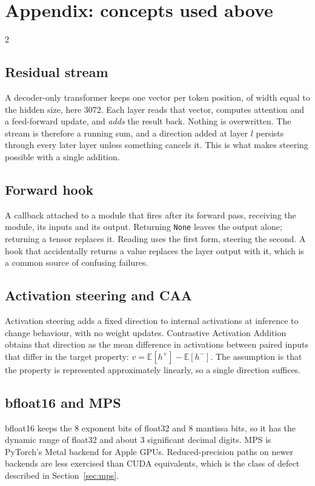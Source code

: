 \documentclass[twocolumn,10pt,a4paper]{article}
\newcommand{\code}[1]{\texttt{\small #1}}
\begin{document}
\section*{Appendix: concepts used above}
\begin{multicols}{2}
\small

\subsection*{Residual stream}
A decoder-only transformer keeps one vector per token position, of width equal to
the hidden size, here 3072. Each layer reads that vector, computes attention and
a feed-forward update, and \emph{adds} the result back. Nothing is overwritten.
The stream is therefore a running sum, and a direction added at layer $l$
persists through every later layer unless something cancels it. This is what
makes steering possible with a single addition.

\subsection*{Forward hook}
A callback attached to a module that fires after its forward pass, receiving the
module, its inputs and its output. Returning \code{None} leaves the output alone;
returning a tensor replaces it. Reading uses the first form, steering the second.
A hook that accidentally returns a value replaces the layer output with it, which
is a common source of confusing failures.

\subsection*{Activation steering and CAA}
Activation steering adds a fixed direction to internal activations at inference
to change behaviour, with no weight updates. Contrastive Activation Addition
obtains that direction as the mean difference in activations between paired
inputs that differ in the target property:
$v = \mathbb{E}[h^+] - \mathbb{E}[h^-]$. The assumption is that the property is
represented approximately linearly, so a single direction suffices.

\subsection*{bfloat16 and MPS}
bfloat16 keeps the 8 exponent bits of float32 and 8 mantissa bits, so it has the
dynamic range of float32 and about 3 significant decimal digits. MPS is PyTorch's
Metal backend for Apple GPUs. Reduced-precision paths on newer backends are
less exercised than CUDA equivalents, which is the class of defect described in
Section~\ref{sec:mps}.


\end{multicols}
\end{document}
